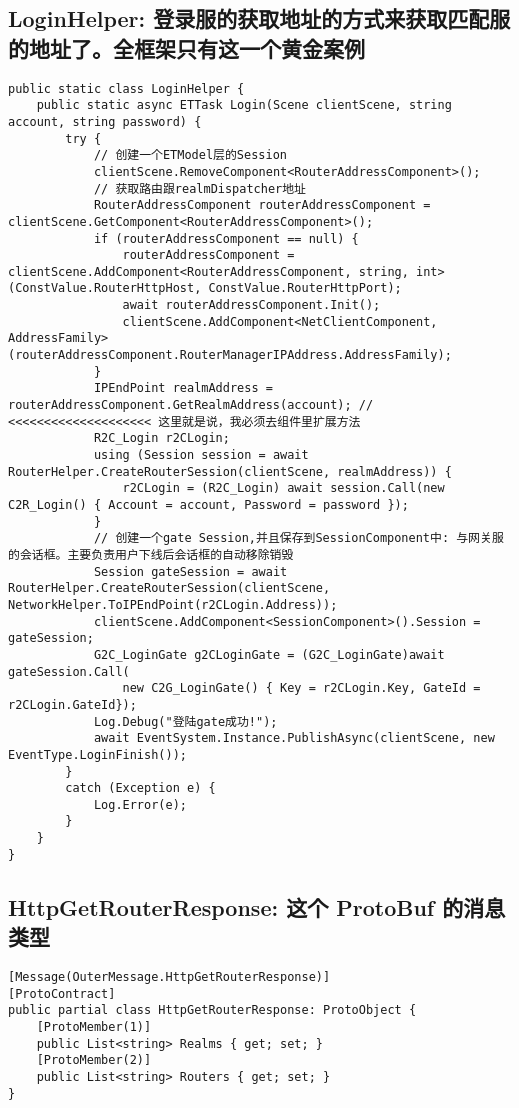 \documentclass[9pt, b5paper]{article}
\begin{document}
\subsection{LoginHelper: 登录服的获取地址的方式来获取匹配服的地址了。全框架只有这一个黄金案例}
\label{sec-7-7}
\begin{verbatim}
public static class LoginHelper {
    public static async ETTask Login(Scene clientScene, string account, string password) {
        try {
            // 创建一个ETModel层的Session
            clientScene.RemoveComponent<RouterAddressComponent>();
            // 获取路由跟realmDispatcher地址
            RouterAddressComponent routerAddressComponent = clientScene.GetComponent<RouterAddressComponent>();
            if (routerAddressComponent == null) {
                routerAddressComponent = clientScene.AddComponent<RouterAddressComponent, string, int>(ConstValue.RouterHttpHost, ConstValue.RouterHttpPort);
                await routerAddressComponent.Init();
                clientScene.AddComponent<NetClientComponent, AddressFamily>(routerAddressComponent.RouterManagerIPAddress.AddressFamily);
            }
            IPEndPoint realmAddress = routerAddressComponent.GetRealmAddress(account); // <<<<<<<<<<<<<<<<<<<< 这里就是说，我必须去组件里扩展方法
            R2C_Login r2CLogin;
            using (Session session = await RouterHelper.CreateRouterSession(clientScene, realmAddress)) {
                r2CLogin = (R2C_Login) await session.Call(new C2R_Login() { Account = account, Password = password });
            }
            // 创建一个gate Session,并且保存到SessionComponent中: 与网关服的会话框。主要负责用户下线后会话框的自动移除销毁
            Session gateSession = await RouterHelper.CreateRouterSession(clientScene, NetworkHelper.ToIPEndPoint(r2CLogin.Address));
            clientScene.AddComponent<SessionComponent>().Session = gateSession;
            G2C_LoginGate g2CLoginGate = (G2C_LoginGate)await gateSession.Call(
                new C2G_LoginGate() { Key = r2CLogin.Key, GateId = r2CLogin.GateId});
            Log.Debug("登陆gate成功!");
            await EventSystem.Instance.PublishAsync(clientScene, new EventType.LoginFinish());
        }
        catch (Exception e) {
            Log.Error(e);
        }
    } 
}
\end{verbatim}
\subsection{HttpGetRouterResponse: 这个 ProtoBuf 的消息类型}
\label{sec-7-8}
\begin{verbatim}
[Message(OuterMessage.HttpGetRouterResponse)]
[ProtoContract]
public partial class HttpGetRouterResponse: ProtoObject {
    [ProtoMember(1)]
    public List<string> Realms { get; set; }
    [ProtoMember(2)]
    public List<string> Routers { get; set; }
}
\end{verbatim}
\end{document}
